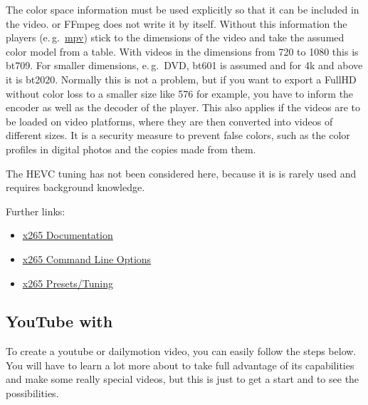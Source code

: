 The color space information must be used explicitly so that it can
be included in the video. \CGG{} or FFmpeg does not write it by
itself. Without this information the players (e.\,g.\
\href{https://mpv.io/}{mpv}) stick to the dimensions of the video
and take the assumed color model from a table. With videos in the
dimensions from 720 to 1080 this is bt709. For smaller dimensions,
e.\,g.\ DVD, bt601 is assumed and for 4k and above it is
bt2020. Normally this is not a problem, but if you want to export a
FullHD without color loss to a smaller size like 576 for example,
you have to inform the encoder as well as the decoder of the
player. This also applies if the videos are to be loaded on video
platforms, where they are then converted into videos of different
sizes. It is a security measure to prevent false colors, such as the
color profiles in digital photos and the copies made from them.

The HEVC tuning has not been considered here, because it is is
rarely used and requires background knowledge.

Further links:
\begin{itemize}
	\item \href{http://x265.readthedocs.org/en/default/}{x265
		Documentation}
	\item \href{http://x265.readthedocs.org/en/latest/cli.html}{x265
		Command Line Options}
	\item \href{http://x265.readthedocs.org/en/latest/presets.html}{x265
		Presets/Tuning}
\end{itemize}


\subsection{YouTube with \CGG{}}%
\label{sub:youtube_with_cinelerra}

To create a youtube or dailymotion video, you can easily follow the steps below.  You will have to learn a lot more about \CGG{} to take full advantage of its capabilities and make some really special videos, but this is just to get a start and to see the possibilities.

